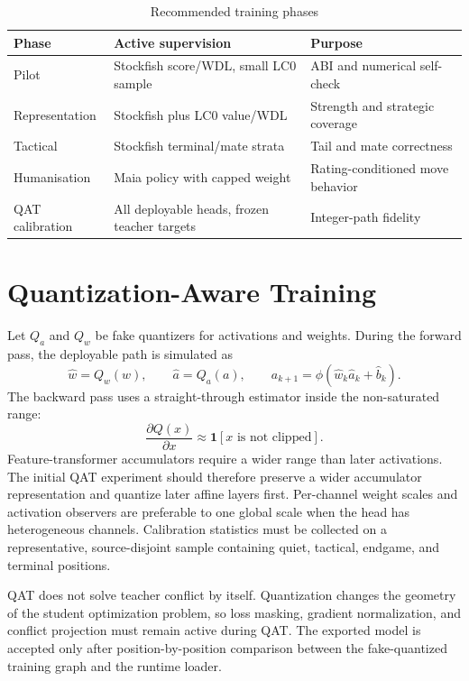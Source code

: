 \documentclass[conference]{IEEEtran}
\begin{document}
\begin{table}[t]
\centering
\caption{Recommended training phases}
\label{tab:phases}
\begin{tabular}{p{}p{}p{}}
\toprule
Phase & Active supervision & Purpose\\
\midrule
Pilot & Stockfish score/WDL, small LC0 sample & ABI and numerical self-check\\
Representation & Stockfish plus LC0 value/WDL & Strength and strategic coverage\\
Tactical & Stockfish terminal/mate strata & Tail and mate correctness\\
Humanisation & Maia policy with capped weight & Rating-conditioned move behavior\\
QAT calibration & All deployable heads, frozen teacher targets & Integer-path fidelity\\
\bottomrule
\end{tabular}
\end{table}

\section{Quantization-Aware Training}
Let $Q_a$ and $Q_w$ be fake quantizers for activations and weights. During the forward pass, the deployable path is simulated as
\begin{equation}
 \widehat{w}=Q_w(w),\qquad \widehat{a}=Q_a(a),\qquad a_{k+1}=\phi(\widehat{w}_k\widehat{a}_k+\widehat{b}_k).
\end{equation}
The backward pass uses a straight-through estimator inside the non-saturated range:
\begin{equation}
 \frac{\partial Q(x)}{\partial x}\approx \mathbf{1}[x\text{ is not clipped}].
\end{equation}
Feature-transformer accumulators require a wider range than later activations. The initial QAT experiment should therefore preserve a wider accumulator representation and quantize later affine layers first. Per-channel weight scales and activation observers are preferable to one global scale when the head has heterogeneous channels. Calibration statistics must be collected on a representative, source-disjoint sample containing quiet, tactical, endgame, and terminal positions.

QAT does not solve teacher conflict by itself. Quantization changes the geometry of the student optimization problem, so loss masking, gradient normalization, and conflict projection must remain active during QAT. The exported model is accepted only after position-by-position comparison between the fake-quantized training graph and the runtime loader.
\end{document}
